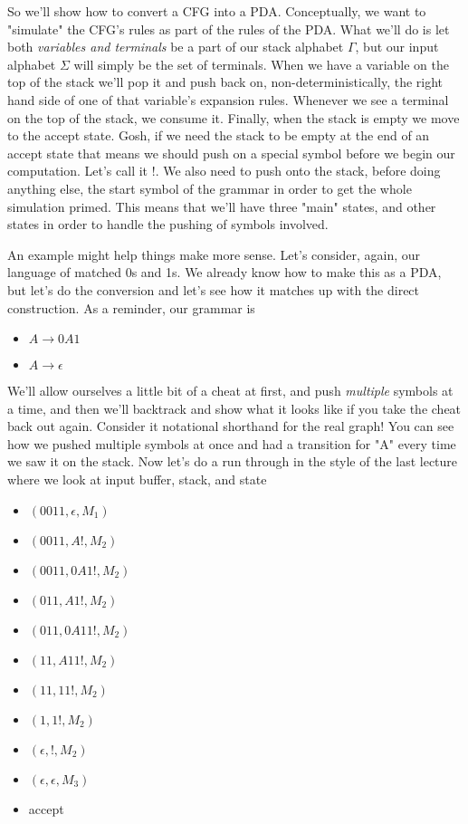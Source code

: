 \documentclass[11pt]{article}
\begin{document}
So we'll show how to convert a CFG into a PDA. Conceptually, we want to "simulate" the CFG's rules as part of the rules of the PDA. What we'll do is let both \emph{variables and terminals} be a part of our stack alphabet $\Gamma$, but our input alphabet $\Sigma$ will simply be the set of terminals. When we have a variable on the top of the stack we'll pop it and push back on, non-deterministically, the right hand side of one of that variable's expansion rules. Whenever we see a terminal on the top of the stack, we consume it. Finally, when the stack is empty we move to the accept state. Gosh, if we need the stack to be empty at the end of an accept state that means we should push on a special symbol before we begin our computation. Let's call it $!$. We also need to push onto the stack, before doing anything else, the start symbol of the grammar in order to get the whole simulation primed. This means that we'll have three "main" states, and other states in order to handle the pushing of symbols involved. 

An example might help things make more sense. Let's consider, again, our language of matched 0s and 1s. We already know how to make this as a PDA, but let's do the conversion and let's see how it matches up with the direct construction. As a reminder, our grammar is 

\begin{itemize}
\item $A \to 0A1$
\item $A \to \epsilon$
\end{itemize}

We'll allow ourselves a little bit of a cheat at first, and push \emph{multiple} symbols at a time, and then we'll backtrack and show what it looks like if you take the cheat back out again. Consider it notational shorthand for the real graph!
You can see how we pushed multiple symbols at once and had a transition for "A" every time we saw it on the stack. Now let's do a run through in the style of the last lecture where we look at input buffer, stack, and state

\begin{itemize}
\item $(0011,\epsilon,M_1)$
\item $(0011,A!, M_2)$
\item $(0011,0A1!, M_2)$
\item $(011,A1!, M_2)$
\item $(011,0A11!, M_2)$
\item $(11, A11!, M_2)$
\item $(11, 11!, M_2)$
\item $(1, 1!, M_2)$
\item $(\epsilon, !, M_2)$
\item $(\epsilon, \epsilon, M_3)$
\item accept
\end{itemize}
\end{document}
